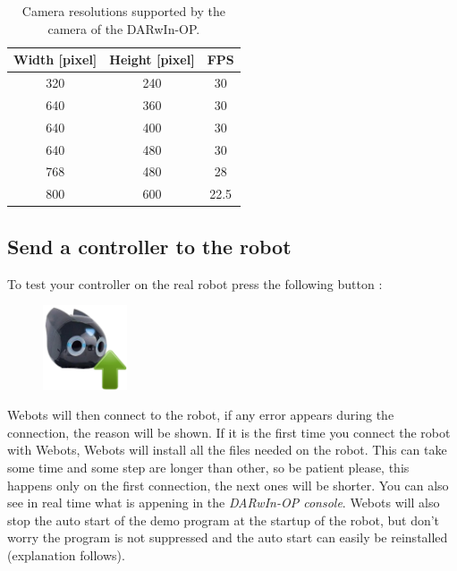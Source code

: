 \documentclass[a4paper, 12pt]{article}  		%
\begin{document}
\begin{table}[H]
\begin{center}
\begin{tabular}{ | c | c | c | }

\hline
Width [pixel] & Height [pixel] & FPS \\ 
\hline
\hline
320 & 240 & 30 \\
\hline
640 & 360 & 30 \\
\hline
640 & 400 & 30 \\
\hline
640 & 480 & 30 \\
\hline
768 & 480 & 28 \\
\hline
800 & 600 & 22.5 \\
\hline
\end{tabular}
\caption{Camera resolutions supported by the camera of the DARwIn-OP.}
\label{tab:cameraResolution}
\end{center}
\end{table}

\subsection{Send a controller to the robot}
To test your controller on the real robot press the following button :
\begin{figure}[H]
\begin{center}
\includegraphics[width=2.5cm]{send.png}
\label{send}
\end{center}
\end{figure}

Webots will then connect to the robot, if any error appears during the connection, the reason will be shown. If it is the first time you connect the robot with Webots, Webots will install all the files needed on the robot. This can take some time and some step are longer than other, so be patient please, this happens only on the first connection, the next ones will be shorter. You can also see in real time what is appening in the \textit{DARwIn-OP console}. Webots will also stop the auto start of the demo program at the startup of the robot, but don't worry the program is not suppressed and the auto start can easily be reinstalled (explanation follows).\\
\end{document}
